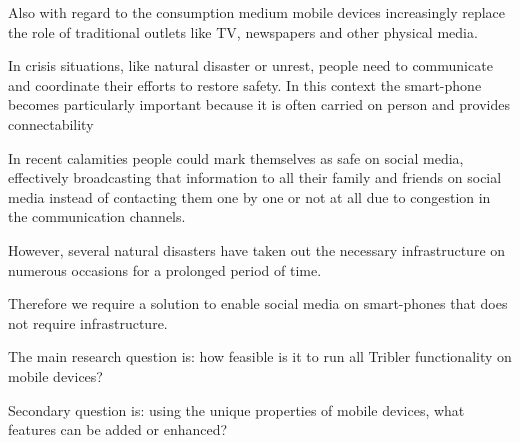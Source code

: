 Also with regard to the consumption medium mobile devices increasingly replace the role of traditional outlets like TV, newspapers and other physical media.

In crisis situations, like natural disaster or unrest, people need to communicate and coordinate their efforts to restore safety.
In this context the smart-phone becomes particularly important because it is often carried on person and provides connectability

In recent calamities people could mark themselves as safe on social media, effectively broadcasting that information to all their family and friends on social media instead of contacting them one by one or not at all due to congestion in the communication channels.

However, several natural disasters have taken out the necessary infrastructure on numerous occasions for a prolonged period of time. %

Therefore we require a solution to enable social media on smart-phones that does not require infrastructure. %





The main research question is: how feasible is it to run all Tribler functionality on mobile devices? %

Secondary question is: using the unique properties of mobile devices, what features can be added or enhanced?
